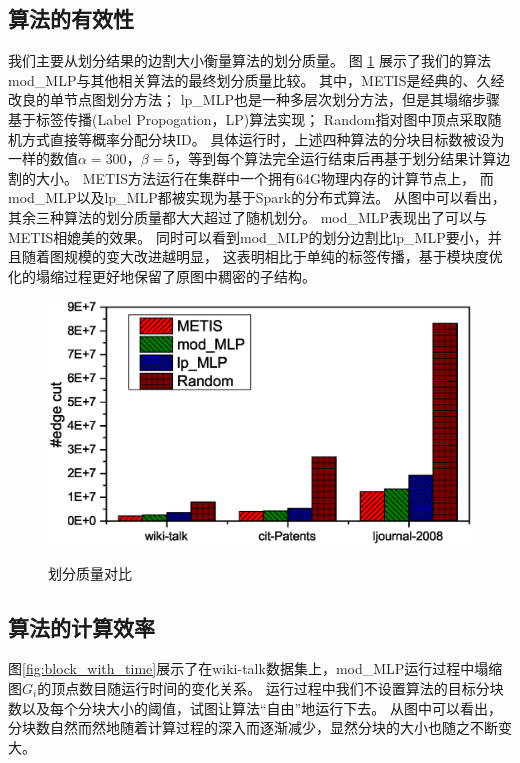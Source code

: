 \documentclass[master]{njuthesis}
\begin{document}
\subsection{算法的有效性}
我们主要从划分结果的边割大小衡量算法的划分质量。
图 \ref{fig:partitionquality} 展示了我们的算法mod\string_MLP与其他相关算法的最终划分质量比较。
其中，METIS\cite{Karypis95metis}是经典的、久经改良的单节点图划分方法；
lp\string_MLP\cite{DBLP:conf/icde/WangXSW14}也是一种多层次划分方法，但是其塌缩步骤基于标签传播\cite{raghavan2007near}(Label Propogation，LP)算法实现；
Random指对图中顶点采取随机方式直接等概率分配分块ID。
具体运行时，上述四种算法的分块目标数被设为一样的数值$\alpha=300$，$\beta=5$，等到每个算法完全运行结束后再基于划分结果计算边割的大小。
METIS方法运行在集群中一个拥有64G物理内存的计算节点上，
而mod\string_MLP以及lp\string_MLP都被实现为基于Spark的分布式算法。
从图中可以看出，其余三种算法的划分质量都大大超过了随机划分。
mod\string_MLP表现出了可以与METIS相媲美的效果。
同时可以看到mod\string_MLP的划分边割比lp\string_MLP要小，并且随着图规模的变大改进越明显，
这表明相比于单纯的标签传播，基于模块度优化的塌缩过程更好地保留了原图中稠密的子结构。
\begin{figure}[h]
  \centering
  \includegraphics[width= 1\textwidth]{figure/edge_cut.eps}\\
  \caption{划分质量对比}
   \label{fig:partitionquality}
\end{figure}
\subsection{算法的计算效率}
图\ref{fig:block_with_time}展示了在wiki-talk数据集上，mod\string_MLP运行过程中塌缩图$G_i$的顶点数目随运行时间的变化关系。
运行过程中我们不设置算法的目标分块数以及每个分块大小的阈值，试图让算法“自由”地运行下去。
从图中可以看出，分块数自然而然地随着计算过程的深入而逐渐减少，显然分块的大小也随之不断变大。
\end{document}
